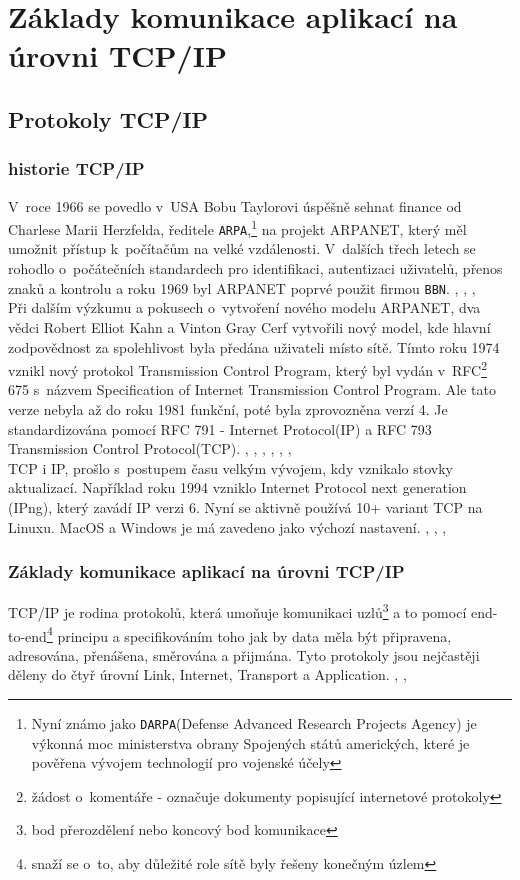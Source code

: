 \documentclass[12pt]{report}			%
\begin{document}
	
	\part{Základy komunikace aplikací na úrovni TCP/IP}
	
		\chapter{Protokoly TCP/IP}
			
			\section{historie TCP/IP}
				V~roce 1966 se povedlo v~USA Bobu Taylorovi úspěšně sehnat finance od Charlese Marii Herzfelda, ředitele \texttt{ARPA},\footnote{Nyní známo jako \texttt{DARPA}(Defense Advanced Research Projects Agency) je výkonná moc ministerstva obrany Spojených států amerických, které je pověřena vývojem technologií pro vojenské účely} na projekt ARPANET, který měl umožnit přístup k~počítačům na velké vzdálenosti. V~dalších třech letech se rohodlo o~počátečních standardech pro identifikaci, autentizaci uživatelů, přenos znaků a kontrolu a roku 1969 byl ARPANET poprvé použit firmou \texttt{BBN}. \cite{History}, \cite{History3}, \cite{History2}, \cite{ARPNET} \\
Při dalším výzkumu a pokusech o~vytvoření nového modelu ARPANET, dva vědci Robert Elliot Kahn a Vinton Gray Cerf vytvořili nový model, kde hlavní zodpovědnost za spolehlivost byla předána uživateli místo sítě. Tímto roku 1974 vznikl nový protokol Transmission Control Program, který byl vydán v~RFC\footnote{žádost o~komentáře - označuje dokumenty popisující internetové protokoly} 675 s~názvem Specification of Internet Transmission Control Program. Ale tato verze nebyla až do roku 1981 funkční, poté byla zprovozněna verzí 4. Je standardizována pomocí RFC 791 - Internet Protocol(IP) a RFC 793 Transmission Control Protocol(TCP). \cite{History}, \cite{History3}, \cite{History2}, \cite{ARPNET}, \cite{IP}, \cite{TCP}, \cite{Rules}
\\
TCP i IP, prošlo s~postupem času velkým vývojem, kdy vznikalo stovky aktualizací. Například roku 1994 vzniklo Internet Protocol next generation (IPng), který zavádí IP verzi 6. Nyní se aktivně používá 10+ variant TCP na Linuxu. MacOS a Windows je má zavedeno jako výchozí nastavení. \cite{History3}, \cite{History2}, \cite{History}, \cite{IP}   

			\section{Základy komunikace aplikací na úrovni TCP/IP }
			TCP/IP je rodina protokolů, která umoňuje komunikaci uzlů\footnote{bod přerozdělení nebo koncový bod komunikace} a to pomocí end-to-end\footnote{snaží se o~to, aby důležité role sítě byly řešeny konečným úzlem} principu a specifikováním toho jak by data měla být připravena, adresována, přenášena, směrována a přijmána. Tyto protokoly jsou nejčastěji děleny do čtyř úrovní Link, Internet, Transport a Application. \cite{zakladykomunikace1}, \cite{zakladykomunikace2}, \cite{zakladykomunikace3}
			
\end{document}
